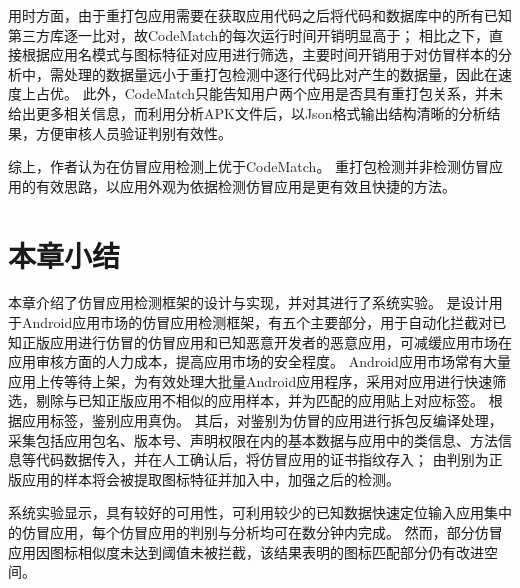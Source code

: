 用时方面，由于重打包应用需要在获取应用代码之后将代码和数据库中的所有已知第三方库逐一比对，故CodeMatch的每次运行时间开销明显高于\mytool ；
相比之下，\mytool 直接根据应用名模式与图标特征对应用进行筛选，主要时间开销用于对仿冒样本的分析中，需处理的数据量远小于重打包检测中逐行代码比对产生的数据量，因此在速度上占优。
此外，CodeMatch只能告知用户两个应用是否具有重打包关系，并未给出更多相关信息，而\mytool 利用\componentC 分析APK文件后，以Json格式输出结构清晰的分析结果，方便审核人员验证判别有效性。

综上，作者认为\mytool 在仿冒应用检测上优于CodeMatch。
重打包检测并非检测仿冒应用的有效思路，以应用外观为依据检测仿冒应用是更有效且快捷的方法。



\section{本章小结}

本章介绍了仿冒应用检测框架\mytool 的设计与实现，并对其进行了系统实验。
\mytool 是设计用于Android应用市场的仿冒应用检测框架，有五个主要部分，用于自动化拦截对已知正版应用进行仿冒的仿冒应用和已知恶意开发者的恶意应用，可减缓应用市场在应用审核方面的人力成本，提高应用市场的安全程度。
Android应用市场常有大量应用上传等待上架，为有效处理大批量Android应用程序，\mytool 采用\componentA 对应用进行快速筛选，剔除与已知正版应用不相似的应用样本，并为匹配的应用贴上对应标签。
\componentB 根据应用标签，鉴别应用真伪。
其后，\componentC 对\componentB 鉴别为仿冒的应用进行拆包反编译处理，采集包括应用包名、版本号、声明权限在内的基本数据与应用中的类信息、方法信息等代码数据传入\componentD ，并在人工确认后，将仿冒应用的证书指纹存入\componentE ；
由\componentB 判别为正版应用的样本将会被提取图标特征并加入\componentE 中，加强之后的检测。

系统实验显示，\mytool 具有较好的可用性，可利用较少的已知数据快速定位输入应用集中的仿冒应用，每个仿冒应用的判别与分析均可在数分钟内完成。
然而，部分仿冒应用因图标相似度未达到阈值未被\mytool 拦截，该结果表明\mytool 的图标匹配部分仍有改进空间。
